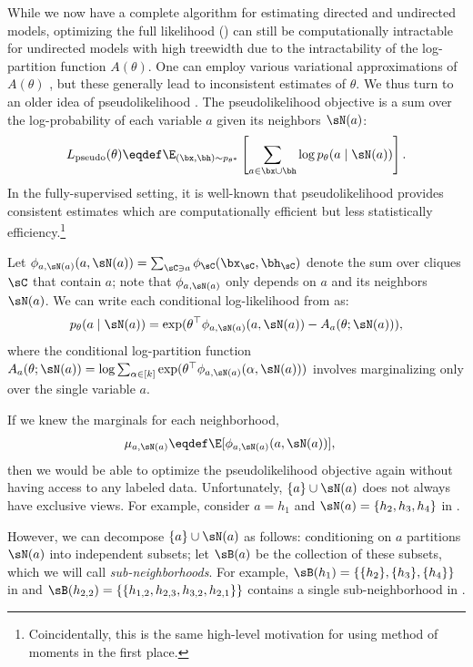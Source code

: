 While we now have a complete algorithm for estimating directed and undirected
models, optimizing the full likelihood ()
can still be computationally intractable for undirected models with high treewidth
due to the intractability of the log-partition function $A(\theta)$.
One can employ various variational approximations of $A(\theta)$ \cite{wainwright08varinf},
but these generally lead to inconsistent estimates of $\theta$.
We thus turn to an older idea of pseudolikelihood \citep{besag75pseudo}.
The pseudolikelihood objective is a sum over the log-probability of each
variable $a$ given its neighbors $\sN(a)$:
\begin{align}
  \label{eqn:pseudolikelihood}
  L_\text{pseudo}(\theta) \eqdef \E_{(\bx,\bh) \sim p_{\theta^*}}\left[\sum_{a \in \bx \cup \bh} \log p_\theta(a \mid \sN(a))\right].
\end{align}
In the fully-supervised setting, it is well-known that pseudolikelihood
provides consistent estimates which are computationally efficient
but less statistically efficiency.\footnote{
Coincidentally, this is the same high-level motivation for using method of
moments in the first place.}

Let $\phi_{a,\sN(a)}(a, \sN(a)) = \sum_{\sC \ni a} \phi_\sC(\bx_\sC,\bh_\sC)$
denote the sum over cliques $\sC$ that contain $a$; note that $\phi_{a, \sN(a)}$ only depends on $a$ and its neighbors $\sN(a)$.
We can write each conditional log-likelihood from  as:
\begin{align*}
p_\theta(a \mid \sN(a)) = \exp(\theta^\top\phi_{a,\sN(a)}(a, \sN(a)) - A_a(\theta; \sN(a))),
\end{align*}
where the conditional log-partition function $A_a(\theta; \sN(a)) = \log \sum_{\alpha \in [k]} \exp(\theta^\top\phi_{a,\sN(a)}(\alpha, \sN(a)))$
involves marginalizing only over the single variable $a$.

If we knew the marginals for each neighborhood,
\begin{align}
  \mu_{a,\sN(a)} &\eqdef \E[\phi_{a,\sN(a)}(a,\sN(a))], \label{eqn:neighborhoodFeatures}
\end{align}
then we would be able to optimize the pseudolikelihood objective again without
having access to any labeled data.
Unfortunately, $\{a\}\cup\sN(a)$ does not always have exclusive views.
For example, consider $a = h_1$ and $\sN(a) = \{h_2,h_3,h_4\}$ in .

However, we can decompose $\{a\}\cup\sN(a)$ as follows:
conditioning on $a$ partitions $\sN(a)$ into independent subsets;
let $\sB(a)$ be the collection of these subsets,
which we will call \emph{sub-neighborhoods}.
For example, $\sB(h_1) = \{ \{h_2\},\{h_3\},\{h_4\} \}$ in 
and $\sB(h_{2,2}) = \{ \{ h_{1,2}, h_{2,3}, h_{3,2}, h_{2,1} \} \}$ contains a single sub-neighborhood in .

